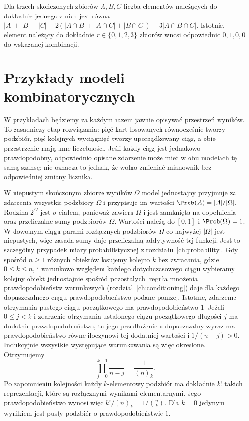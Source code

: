 \begin{przyklad}
Dla trzech skończonych zbiorów $A,B,C$ liczba elementów należących do dokładnie
jednego z nich jest równa
$|A|+|B|+|C|-2(|A\cap B|+|A\cap C|+|B\cap C|)+3|A\cap B\cap C|$.
Istotnie, element należący do dokładnie $r\in\{0,1,2,3\}$ zbiorów
wnosi odpowiednio $0,1,0,0$ do wskazanej kombinacji.
\end{przyklad}

\section{Przykłady modeli kombinatorycznych}
W przykładach będziemy za każdym razem jawnie opisywać
przestrzeń wyników. To zasadniczy etap rozwiązania: pięć kart
losowanych równocześnie tworzy podzbiór, pięć kolejnych wyciągnięć
tworzy uporządkowany ciąg, a obie przestrzenie mają inne liczebności.
Jeśli każdy ciąg jest jednakowo prawdopodobny, odpowiednio opisane
zdarzenie może mieć w obu modelach tę samą szansę; nie oznacza to
jednak, że wolno zmieniać mianownik bez odpowiedniej zmiany licznika.

W niepustym skończonym zbiorze wyników $\Omega$ model
jednostajny przyjmuje za zdarzenia wszystkie podzbiory
$\Omega$ i przypisuje im wartości $\Prob(A)=|A|/|\Omega|$.
Rodzina $2^\Omega$ jest $\sigma$-ciałem, ponieważ zawiera
$\Omega$ i jest zamknięta na dopełnienia oraz przeliczalne
sumy podzbiorów $\Omega$.
Wartości należą do $[0,1]$ i $\Prob(\Omega)=1$.
W dowolnym ciągu parami rozłącznych podzbiorów $\Omega$
co najwyżej $|\Omega|$ jest niepustych, więc zasada sumy
daje przeliczalną addytywność tej funkcji. Jest to szczególny
przypadek miary probabilistycznej z rozdziału~\ref{ch:probability}.
Gdy spośród $n\geq1$ różnych obiektów losujemy kolejno $k$
bez zwracania, gdzie $0\leq k\leq n$, i warunkowo względem
każdego dotychczasowego ciągu wybieramy kolejny obiekt
jednostajnie spośród pozostałych, reguła mnożenia prawdopodobieństw
warunkowych (rozdział~\ref{ch:conditioning}) daje dla każdego
dopuszczalnego ciągu prawdopodobieństwo podane poniżej.
Istotnie, zdarzenie otrzymania pustego ciągu początkowego
ma prawdopodobieństwo $1$. Jeżeli $0\leq j<k$ i zdarzenie
otrzymania ustalonego ciągu początkowego długości $j$
ma dodatnie prawdopodobieństwo,
to jego przedłużenie o dopuszczalny wyraz ma prawdopodobieństwo
równe iloczynowi tej dodatniej wartości i $1/(n-j)>0$.
Indukcyjnie wszystkie występujące warunkowania są więc określone.
Otrzymujemy
\[
\prod_{j=0}^{k-1}\frac{1}{n-j}=\frac{1}{(n)_k}.
\]
Po zapomnieniu kolejności każdy $k$-elementowy podzbiór ma
dokładnie $k!$ takich reprezentacji, które są rozłącznymi
wynikami elementarnymi. Jego prawdopodobieństwo wynosi więc
$k!/(n)_k=1/\binom nk$. Dla $k=0$ jedynym wynikiem jest pusty
podzbiór o prawdopodobieństwie $1$.

